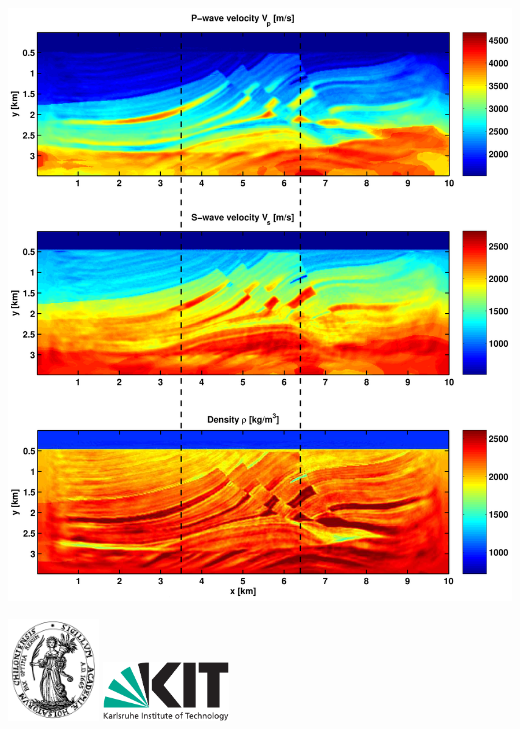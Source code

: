 \begin{center}
\begin{minipage}[t]{1.00\textwidth}
\begin{minipage}[h]{0.65\textwidth}
\includegraphics[width=\textwidth]{figures/IFOS_Marmousi1.png}

\end{minipage}
\par\endgroup
\end{minipage}
\end{center}

\vspace{0.5cm}

\begin{center}
\includegraphics[width=0.18\textwidth]{CAU_Siegel.png}
\hspace{2cm}
\includegraphics[width=0.25\textwidth]{Kitlogo_en_cmyk.pdf}
\end{center}
\rmfamily